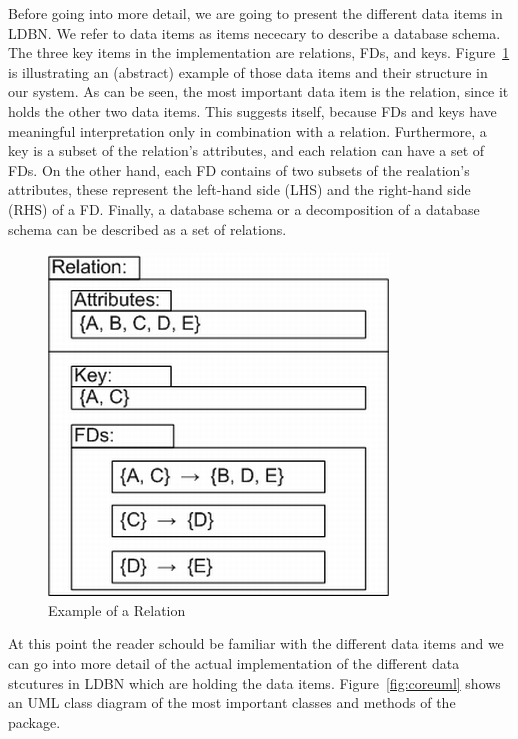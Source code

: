 Before going into more detail, we are going to present the different data items in LDBN. 
We refer to data items as items nececary to describe a database schema.  
The three key items in the implementation are relations, FDs, and keys.
Figure~\ref{fig:relexample} is illustrating
an (abstract) example of those data items and their structure in our system. 
As can be seen, the most important data item is the relation, since
it holds the other two data items. This suggests itself, because FDs and keys have meaningful
interpretation only in combination with a relation. Furthermore, a key is a subset of 
the relation's attributes, and
each relation can have a set of FDs. On the other hand, 
each FD contains of two subsets of
the realation's attributes, these represent the left-hand side (LHS) and the 
right-hand side (RHS) of a FD. Finally, a database schema or a decomposition of
a database schema can be described as a set of relations.


\begin{figure}[h]
	\begin{center}
		\includegraphics[scale=0.5]{./img/relation-example01a.png}
		\caption{Example of a Relation}
		\label{fig:relexample}
	\end{center}
\end{figure}

At this point the reader schould be familiar with the different data items 
and we can go into more detail of the 
actual implementation of the different data stcutures in LDBN which are holding 
the data items. Figure~\ref{fig:coreuml} shows an UML class diagram of the most important 
classes and methods of the package. 

